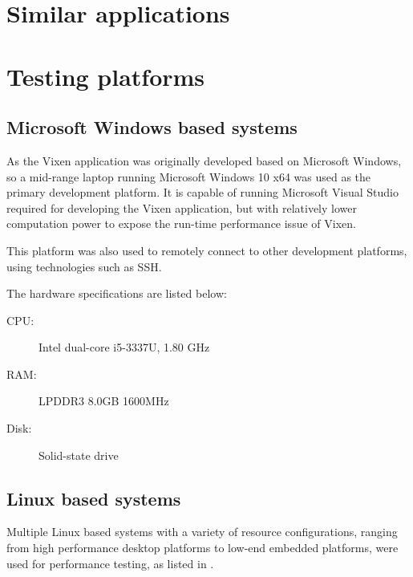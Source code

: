 \section{Similar applications}


\section{Testing platforms}

\subsection{Microsoft Windows based systems}

As the Vixen application was originally developed based on Microsoft Windows, so a mid-range laptop running Microsoft Windows 10 x64 was used as the primary development platform. It is capable of running Microsoft Visual Studio required for developing the Vixen application, but with relatively lower computation power to expose the run-time performance issue of Vixen.

This platform was also used to remotely connect to other development platforms, using technologies such as SSH.

The hardware specifications are listed below:

\begin{description}
  \item[CPU:]	Intel dual-core i5-3337U, 1.80 GHz
  \item[RAM:]	LPDDR3 8.0GB 1600MHz
  \item[Disk:]	Solid-state drive
\end{description}

\subsection{Linux based systems}
\label{sec:systems}

Multiple Linux based systems with a variety of resource configurations, ranging from high performance desktop platforms to low-end embedded platforms, were used for performance testing, as listed in .

